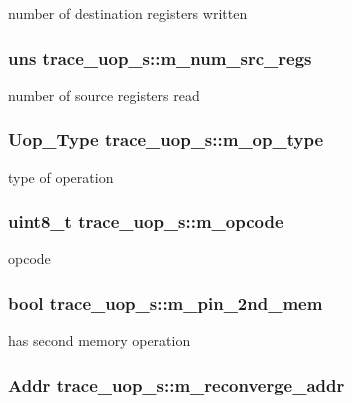 \label{structtrace__uop__s_a2f05dce7998347a9d31e248e95e6ca3b}
number of destination registers written \hypertarget{structtrace__uop__s_adb68dace5de092c07e737faa420aee35}{
\subsubsection[{m\_\-num\_\-src\_\-regs}]{\setlength{\rightskip}{0pt plus 5cm}uns {\bf trace\_\-uop\_\-s::m\_\-num\_\-src\_\-regs}}}
\label{structtrace__uop__s_adb68dace5de092c07e737faa420aee35}
number of source registers read \hypertarget{structtrace__uop__s_af40966b23eb6a1a52c585cff32b1e22b}{
\subsubsection[{m\_\-op\_\-type}]{\setlength{\rightskip}{0pt plus 5cm}Uop\_\-Type {\bf trace\_\-uop\_\-s::m\_\-op\_\-type}}}
\label{structtrace__uop__s_af40966b23eb6a1a52c585cff32b1e22b}
type of operation \hypertarget{structtrace__uop__s_af4dcf3db0186150544c87b255e3db33d}{
\subsubsection[{m\_\-opcode}]{\setlength{\rightskip}{0pt plus 5cm}uint8\_\-t {\bf trace\_\-uop\_\-s::m\_\-opcode}}}
\label{structtrace__uop__s_af4dcf3db0186150544c87b255e3db33d}
opcode \hypertarget{structtrace__uop__s_a2921ae80b5fe2a90e8d2454c5b08abb7}{
\subsubsection[{m\_\-pin\_\-2nd\_\-mem}]{\setlength{\rightskip}{0pt plus 5cm}bool {\bf trace\_\-uop\_\-s::m\_\-pin\_\-2nd\_\-mem}}}
\label{structtrace__uop__s_a2921ae80b5fe2a90e8d2454c5b08abb7}
has second memory operation \hypertarget{structtrace__uop__s_a85a2ce721949b132c64557ceb52b4769}{
\subsubsection[{m\_\-reconverge\_\-addr}]{\setlength{\rightskip}{0pt plus 5cm}Addr {\bf trace\_\-uop\_\-s::m\_\-reconverge\_\-addr}}}
